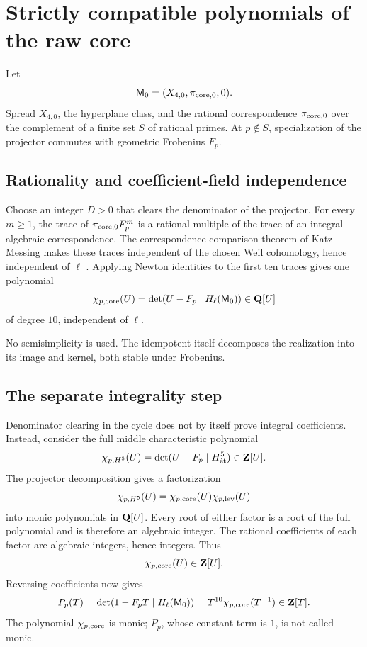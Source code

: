 \section{Strictly compatible polynomials of the raw core}
\label{sec:compatible}

Let
\[
\mathsf M_0=(X_{4,0},\pi_{\mathrm{core},0},0).
\]
Spread \(X_{4,0}\), the hyperplane class, and the rational correspondence
\(\pi_{\mathrm{core},0}\) over the complement of a finite set \(S\) of rational
primes.  At \(p\notin S\), specialization of the projector commutes with
geometric Frobenius \(F_p\).

\subsection{Rationality and coefficient-field independence}

Choose an integer \(D>0\) that clears the denominator of the projector.
For every \(m\ge1\), the trace of
\(\pi_{\mathrm{core},0}F_p^m\) is a rational multiple of the trace of an integral
algebraic correspondence.  The correspondence comparison theorem of
Katz--Messing makes these traces independent of the chosen Weil
cohomology, hence independent of \(\ell\)
\cite[Theorem 2(2), pp. 76--77]{KatzMessing1974}.  Applying Newton
identities to the first ten traces gives one polynomial
\begin{equation}
\chi_{p,\mathrm{core}}(U)
=\det(U-F_p\mid H_\ell(\mathsf M_0))\in\mathbf Q[U]
\label{eq:chi-core-Q}
\end{equation}
of degree \(10\), independent of \(\ell\).

No semisimplicity is used.  The idempotent itself decomposes the
realization into its image and kernel, both stable under Frobenius.

\subsection{The separate integrality step}

Denominator clearing in the cycle does not by itself prove integral
coefficients.  Instead, consider the full middle characteristic polynomial
\[
\chi_{p,H^5}(U)=\det(U-F_p\mid H^5_{\mathrm{\acute et}})
\in\mathbf Z[U].
\]
The projector decomposition gives a factorization
\[
\chi_{p,H^5}(U)=
\chi_{p,\mathrm{core}}(U)\chi_{p,\mathrm{lev}}(U)
\]
into monic polynomials in \(\mathbf Q[U]\).  Every root of either factor is a
root of the full polynomial and is therefore an algebraic integer.
The rational coefficients of each factor are algebraic integers, hence
integers.  Thus
\[
\chi_{p,\mathrm{core}}(U)\in\mathbf Z[U].
\]
Reversing coefficients now gives
\begin{equation}
P_p(T)=\det(1-F_pT\mid H_\ell(\mathsf M_0))
=T^{10}\chi_{p,\mathrm{core}}(T^{-1})\in\mathbf Z[T].
\label{eq:P-from-chi}
\end{equation}
The polynomial \(\chi_{p,\mathrm{core}}\) is monic; \(P_p\), whose constant term
is \(1\), is not called monic.

